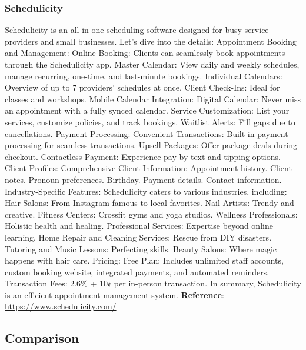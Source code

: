 \documentclass{article}
\begin{document}
      \subsubsection{Schedulicity}
      Schedulicity is an all-in-one scheduling software designed for busy service providers and small businesses. Let’s dive into the details:
      Appointment Booking and Management: Online Booking: Clients can seamlessly book appointments through the Schedulicity app.
      Master Calendar: View daily and weekly schedules, manage recurring, one-time, and last-minute bookings.
      Individual Calendars: Overview of up to 7 providers’ schedules at once.
      Client Check-Ins: Ideal for classes and workshops.
      Mobile Calendar Integration: Digital Calendar: Never miss an appointment with a fully synced calendar.
      Service Customization: List your services, customize policies, and track bookings.
      Waitlist Alerts: Fill gaps due to cancellations.
      Payment Processing: Convenient Transactions: Built-in payment processing for seamless transactions.
      Upsell Packages: Offer package deals during checkout.
      Contactless Payment: Experience pay-by-text and tipping options.
      Client Profiles: Comprehensive Client Information: Appointment history. Client notes. Pronoun preferences. Birthday. Payment details. Contact information. Industry-Specific Features:
      Schedulicity caters to various industries, including:
      Hair Salons: From Instagram-famous to local favorites.
      Nail Artists: Trendy and creative.
      Fitness Centers: Crossfit gyms and yoga studios.
      Wellness Professionals: Holistic health and healing.
      Professional Services: Expertise beyond online learning.
      Home Repair and Cleaning Services: Rescue from DIY disasters.
      Tutoring and Music Lessons: Perfecting skills.
      Beauty Salons: Where magic happens with hair care. Pricing: Free Plan: Includes unlimited staff accounts, custom booking website, integrated payments, and automated reminders.
      Transaction Fees: 2.6\% + 10¢ per in-person transaction.
      In summary, Schedulicity is an efficient appointment management system.\newline
      \textbf{Reference}: \href{https://www.schedulicity.com/}{https://www.schedulicity.com/}
      
      \subsection{Comparison}
\end{document}
